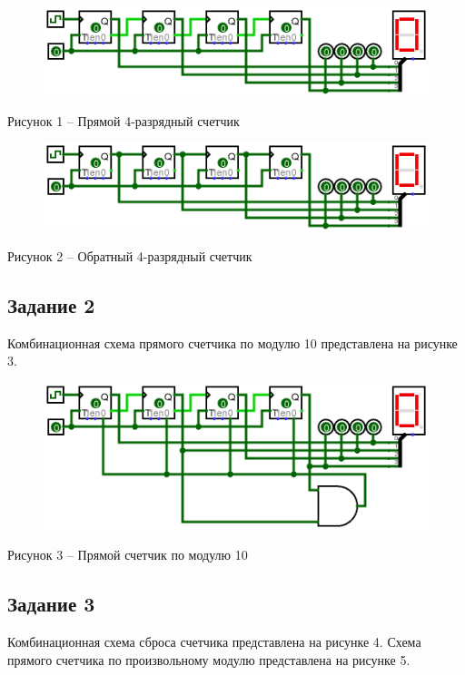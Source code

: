 \documentclass[a4paper,14pt]{extarticle}
\begin{document}
  \begin{figure}[h]
    \centering
    \includegraphics[width=0.8\linewidth]{images/s-1-1}
  \end{figure}
  \begin{center}
    Рисунок 1 – Прямой 4-разрядный счетчик
  \end{center}
  
  \begin{figure}[h]
    \centering
    \includegraphics[width=0.8\linewidth]{images/s-1-2}
  \end{figure}
  \begin{center}
    Рисунок 2 – Обратный 4-разрядный счетчик
  \end{center}
  
  \subsection*{Задание 2}
  Комбинационная схема прямого счетчика по модулю 10 представлена на рисунке 3.
  
  \begin{figure}[h]
    \centering
    \includegraphics[width=0.8\linewidth]{images/s-2}
  \end{figure}
  \begin{center}
    Рисунок 3 – Прямой счетчик по модулю 10
  \end{center}
  
  \subsection*{Задание 3}
  Комбинационная схема сброса счетчика представлена на рисунке 4. Схема прямого счетчика по произвольному модулю представлена на рисунке 5.
  
\end{document}
